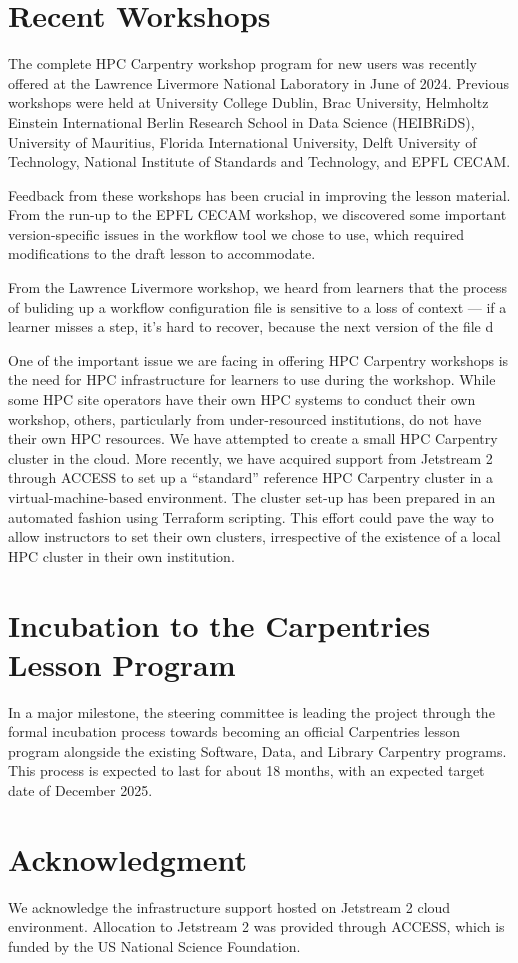 \section{Recent Workshops}

The complete HPC Carpentry workshop program for new users was recently offered at the Lawrence Livermore National Laboratory in June of 2024.
Previous workshops were held at University College Dublin, Brac University, Helmholtz Einstein International Berlin Research School in Data Science (HEIBRiDS), University of Mauritius, Florida International University, Delft University of Technology, National Institute of Standards and Technology, and EPFL CECAM.

Feedback from these workshops has been crucial in improving the lesson material. From the run-up to the EPFL CECAM workshop, we discovered some important version-specific issues in the workflow tool we chose to use, which required modifications to the draft lesson to accommodate. 

From the Lawrence Livermore workshop, we heard from learners that the process of buliding up a workflow configuration file is sensitive to a loss of context --- if a learner misses a step, it's hard to recover, because the next version of the file d 

One of the important issue we are facing in offering HPC Carpentry workshops is the need for HPC infrastructure for learners to use during the workshop.
While some HPC site operators have their own HPC systems to conduct their own workshop, others, particularly from under-resourced institutions, do not have their own HPC resources.
We have attempted to create a small HPC Carpentry cluster in the cloud.
More recently, we have acquired support from Jetstream 2 through ACCESS to set up a ``standard'' reference HPC Carpentry cluster in a virtual-machine-based environment.
The cluster set-up has been prepared in an automated fashion using Terraform scripting.
This effort could pave the way to allow instructors to set their own clusters, irrespective of the existence of a local HPC cluster in their own institution.


\section{Incubation to the Carpentries Lesson Program}

In a major milestone, the steering committee is leading the project through the formal incubation process towards becoming an official Carpentries lesson program alongside the existing Software, Data, and Library Carpentry programs.
This process is expected to last for about 18 months, with an expected target date of December 2025.


\section{Acknowledgment}

We acknowledge the infrastructure support hosted on Jetstream 2 cloud environment. Allocation to Jetstream 2 was provided through ACCESS, which is funded by the US National Science Foundation.
